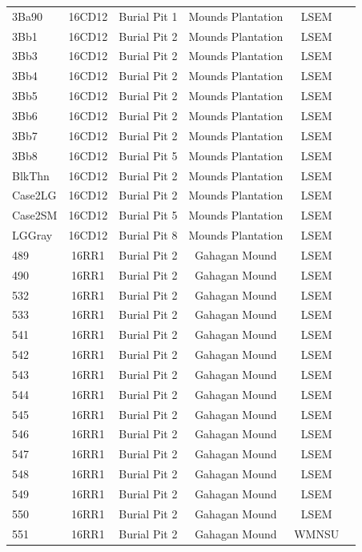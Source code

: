 \documentclass[review]{elsarticle}
\begin{document}
\begin{center}
\begin{longtable}{lccccc}
		3Ba90 & 16CD12 & Burial Pit 1 & Mounds Plantation & LSEM\\
		3Bb1 & 16CD12 & Burial Pit 2 & Mounds Plantation & LSEM\\
		3Bb3 & 16CD12 & Burial Pit 2 & Mounds Plantation & LSEM\\
		3Bb4 & 16CD12 & Burial Pit 2 & Mounds Plantation & LSEM\\
		3Bb5 & 16CD12 & Burial Pit 2 & Mounds Plantation & LSEM\\
		3Bb6 & 16CD12 & Burial Pit 2 & Mounds Plantation & LSEM\\
		3Bb7 & 16CD12 & Burial Pit 2 & Mounds Plantation & LSEM\\
		3Bb8 & 16CD12 & Burial Pit 5 & Mounds Plantation & LSEM\\
		BlkThn & 16CD12 & Burial Pit 2 & Mounds Plantation & LSEM\\
		Case2LG & 16CD12 & Burial Pit 2 & Mounds Plantation & LSEM\\
		Case2SM & 16CD12 & Burial Pit 5 & Mounds Plantation & LSEM\\
		LGGray & 16CD12 & Burial Pit 8 & Mounds Plantation & LSEM\\
		489 & 16RR1 & Burial Pit 2 & Gahagan Mound & LSEM\\
		490 & 16RR1 & Burial Pit 2 & Gahagan Mound & LSEM\\
		532 & 16RR1 & Burial Pit 2 & Gahagan Mound & LSEM\\
		533 & 16RR1 & Burial Pit 2 & Gahagan Mound & LSEM\\
		541 & 16RR1 & Burial Pit 2 & Gahagan Mound & LSEM\\
		542 & 16RR1 & Burial Pit 2 & Gahagan Mound & LSEM\\
		543 & 16RR1 & Burial Pit 2 & Gahagan Mound & LSEM\\
		544 & 16RR1 & Burial Pit 2 & Gahagan Mound & LSEM\\
		545 & 16RR1 & Burial Pit 2 & Gahagan Mound & LSEM\\
		546 & 16RR1 & Burial Pit 2 & Gahagan Mound & LSEM\\
		547 & 16RR1 & Burial Pit 2 & Gahagan Mound & LSEM\\
		548 & 16RR1 & Burial Pit 2 & Gahagan Mound & LSEM\\
		549 & 16RR1 & Burial Pit 2 & Gahagan Mound & LSEM\\
		550 & 16RR1 & Burial Pit 2 & Gahagan Mound & LSEM\\
		551 & 16RR1 & Burial Pit 2 & Gahagan Mound & WMNSU\\

\end{longtable}
\end{center}
\end{document}
